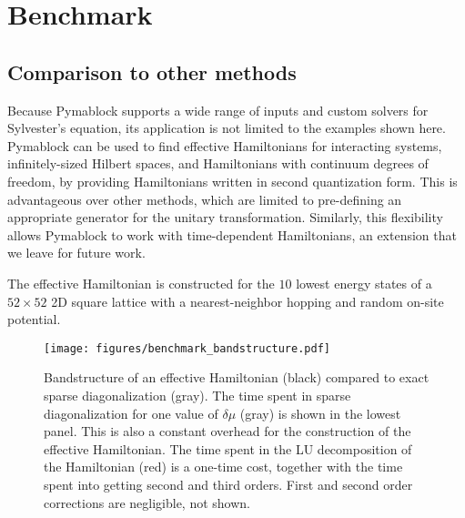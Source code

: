 \section{Benchmark}
\label{sec:benchmark}

\subsection{Comparison to other methods}

Because Pymablock supports a wide range of inputs and custom solvers for
Sylvester's equation, its application is not limited to the examples shown
here.
Pymablock can be used to find effective Hamiltonians for interacting systems,
infinitely-sized Hilbert spaces, and Hamiltonians with continuum degrees of
freedom, by providing Hamiltonians written in second quantization form.
This is advantageous over other methods, which are limited to pre-defining
an appropriate generator for the unitary transformation.
Similarly, this flexibility allows Pymablock to work with time-dependent
Hamiltonians, an extension that we leave for future work.




The effective Hamiltonian is constructed for the $10$ lowest energy
states of a $52 \times 52$ 2D square lattice with a nearest-neighbor
hopping and random on-site potential.
\begin{figure}[h]
    \centering
    \texttt{[image: figures/benchmark\_bandstructure.pdf]}
    \caption{
        Bandstructure of an effective Hamiltonian (black) compared to exact
        sparse diagonalization (gray).
        The time spent in sparse diagonalization for one value of $\delta \mu$
        (gray) is shown in the lowest panel.
        This is also a constant overhead for the construction of the effective
        Hamiltonian.
        The time spent in the LU decomposition of the Hamiltonian (red) is a
        one-time cost, together with the time spent into getting second
        and third orders.
        First and second order corrections are negligible, not shown.
        }
    \label{fig:benchmark_bandstructure}
\end{figure}

\co{}

